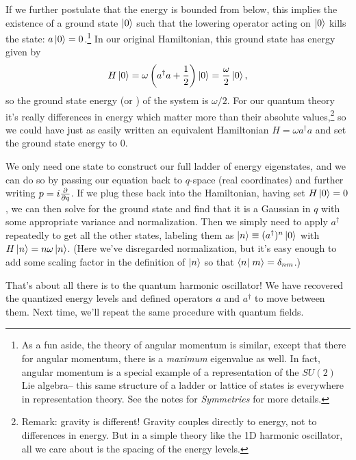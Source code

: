 If we further postulate that the energy is bounded from below, this implies the existence of a ground state $\ket{0}$ such that the lowering operator acting on $\ket{0}$ kills the state: $a\ket{0}= 0$.\footnote{As a fun aside, the theory of angular momentum is similar, except that there for angular momentum, there is a \emph{maximum} eigenvalue as well. In fact, angular momentum is a special example of a representation of the $SU(2)$ Lie algebra-- this same structure of a ladder or lattice of states is everywhere in representation theory. See the notes for \emph{Symmetries} for more details.} In our original Hamiltonian, this ground state has energy given by
$$H \ket{0}=\omega \left(a^\dagger a +\frac{1}{2}\right)\ket{0} = \frac{\omega}{2}\ket{0},$$ so the ground state energy (or ) of the system is $\omega/2$. For our quantum theory it's really differences in energy which matter more than their absolute values,\footnote{Remark: gravity is different! Gravity couples directly to energy, not to differences in energy. But in a simple theory like the 1D harmonic oscillator, all we care about is the spacing of the energy levels.} so we could have just as easily written an equivalent Hamiltonian $H=\omega a^\dagger a$ and set the ground state energy to $0$.

We only need one state to construct our full ladder of energy eigenstates, and we can do so by passing our equation back to $q$-space (real coordinates) and further writing $p=i \P{}{q}$. If we plug these back into the Hamiltonian, having set $H\ket{0}=0$, we can then solve for the ground state and find that it is a Gaussian in $q$ with some appropriate variance and normalization. Then we simply need to apply $a^\dagger$ repeatedly to get all the other states, labeling them as $\ket{n}\equiv(a^\dagger)^n \ket{0}$ with $H \ket{n}=n\omega \ket{n}$. (Here we've disregarded normalization, but it's easy enough to add some scaling factor in the definition of $\ket{n}$ so that $\braket{n}{m}=\delta_{nm}$.)

That's about all there is to the quantum harmonic oscillator! We have recovered the quantized energy levels and defined operators $a$ and $a^\dagger$ to move between them. Next time, we'll repeat the same procedure with quantum fields.